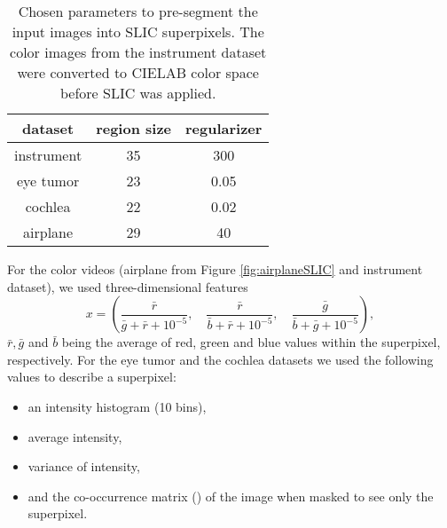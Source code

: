 \begin{table}[ht]
	\centering
	  \caption{Chosen parameters to pre-segment the input images into SLIC superpixels. The color images from the instrument dataset were converted to CIELAB color space before SLIC was applied.}
	  \label{tab:slic-params}
	\begin{tabular}{ | c  c  c | }
	\hline
	  dataset	& region size & regularizer \\ \hline
	  instrument  	& 35 & 300 \\
	  eye tumor  	& 23 & 0.05 \\ 
	  cochlea	& 22 & 0.02 \\ 
	  airplane 	& 29 & 40 \\ \hline
	\end{tabular}
\end{table}
For the color videos (airplane from Figure \ref{fig:airplaneSLIC} and instrument dataset), we used three-dimensional features
\begin{equation*}
 x = \left( \frac{\bar r}{\bar g + \bar r + 10^{-5}}, \quad \frac{\bar r }{\bar b +\bar r + 10^{-5}}, \quad \frac{\bar g}{ \bar b + \bar g + 10^{-5}}\right),
\end{equation*}
$\bar r, \bar g$ and $\bar b$ being the average of red, green and blue values within the superpixel, respectively. 
For the eye tumor and the cochlea datasets we used the following values to describe a superpixel:
\begin{itemize}
 \item an intensity histogram (10 bins),
 \item average intensity,
 \item variance of intensity,
 \item and the co-occurrence matrix (\cite{haralick1973textural}) of the image when masked to see only the superpixel.
\end{itemize}

